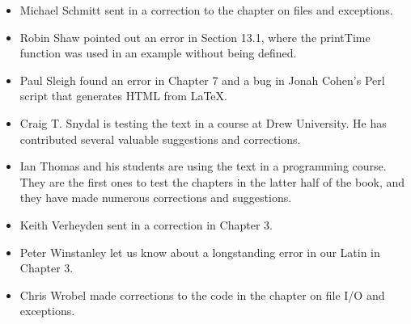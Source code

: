 \documentclass[10pt]{book}
\begin{document}
\begin{itemize}

\item Michael Schmitt sent in a correction to the chapter on files
and exceptions.


\item Robin Shaw pointed out an error in Section 13.1, where the
printTime function was used in an example without being defined.


\item Paul Sleigh found an error in Chapter 7 and a bug in Jonah Cohen's
Perl script that generates HTML from LaTeX.




\item Craig T. Snydal is testing the text in a course at Drew
University.  He has contributed several valuable suggestions and corrections.


\item Ian Thomas and his students are using the text in a programming
course.  They are the first ones to test the chapters in the latter half
of the book, and they have made numerous corrections and suggestions.


\item Keith Verheyden sent in a correction in Chapter 3.


\item Peter Winstanley let us know about a longstanding error in
our Latin in Chapter 3.


\item Chris Wrobel made corrections to the code in the chapter on
file I/O and exceptions. 


\end{itemize}
\end{document}
